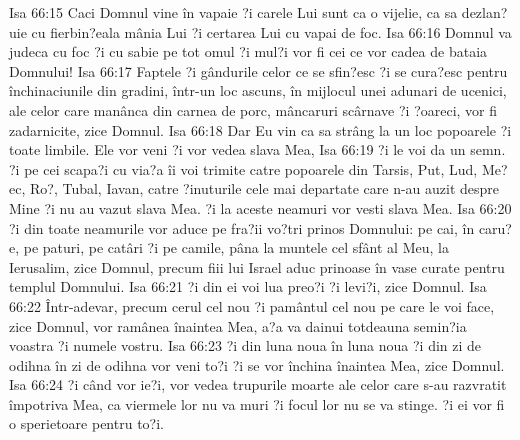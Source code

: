 Isa 66:15  Caci Domnul vine în vapaie ?i carele Lui sunt ca o vijelie, ca sa dezlan?uie cu fierbin?eala mânia Lui ?i certarea Lui cu vapai de foc.
Isa 66:16  Domnul va judeca cu foc ?i cu sabie pe tot omul ?i mul?i vor fi cei ce vor cadea de bataia Domnului!
Isa 66:17  Faptele ?i gândurile celor ce se sfin?esc ?i se cura?esc pentru închinaciunile din gradini, într-un loc ascuns, în mijlocul unei adunari de ucenici, ale celor care manânca din carnea de porc, mâncaruri scârnave ?i ?oareci, vor fi zadarnicite, zice Domnul.
Isa 66:18  Dar Eu vin ca sa strâng la un loc popoarele ?i toate limbile. Ele vor veni ?i vor vedea slava Mea,
Isa 66:19  ?i le voi da un semn. ?i pe cei scapa?i cu via?a îi voi trimite catre popoarele din Tarsis, Put, Lud, Me?ec, Ro?, Tubal, Iavan, catre ?inuturile cele mai departate care n-au auzit despre Mine ?i nu au vazut slava Mea. ?i la aceste neamuri vor vesti slava Mea.
Isa 66:20  ?i din toate neamurile vor aduce pe fra?ii vo?tri prinos Domnului: pe cai, în caru?e, pe paturi, pe catâri ?i pe camile, pâna la muntele cel sfânt al Meu, la Ierusalim, zice Domnul, precum fiii lui Israel aduc prinoase în vase curate pentru templul Domnului.
Isa 66:21  ?i din ei voi lua preo?i ?i levi?i, zice Domnul.
Isa 66:22  Într-adevar, precum cerul cel nou ?i pamântul cel nou pe care le voi face, zice Domnul, vor ramânea înaintea Mea, a?a va dainui totdeauna semin?ia voastra ?i numele vostru.
Isa 66:23  ?i din luna noua în luna noua ?i din zi de odihna în zi de odihna vor veni to?i ?i se vor închina înaintea Mea, zice Domnul.
Isa 66:24  ?i când vor ie?i, vor vedea trupurile moarte ale celor care s-au razvratit împotriva Mea, ca viermele lor nu va muri ?i focul lor nu se va stinge. ?i ei vor fi o sperietoare pentru to?i.


